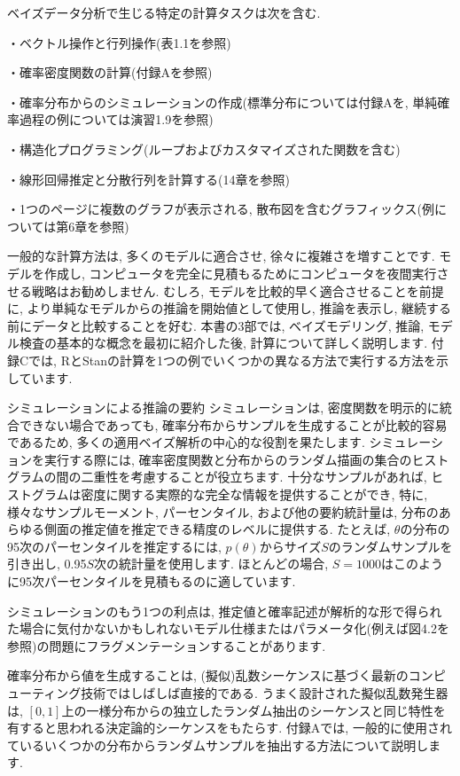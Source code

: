 \documentclass[10pt,dvipdfmx,a4]{beamer}
\begin{document}
\begin{frame}
ベイズデータ分析で生じる特定の計算タスクは次を含む.

・ベクトル操作と行列操作(表1.1を参照)

・確率密度関数の計算(付録Aを参照)

・確率分布からのシミュレーションの作成(標準分布については付録Aを, 単純確率過程の例については演習1.9を参照)

・構造化プログラミング(ループおよびカスタマイズされた関数を含む)

・線形回帰推定と分散行列を計算する(14章を参照)

・1つのページに複数のグラフが表示される, 散布図を含むグラフィックス(例については第6章を参照)

一般的な計算方法は, 多くのモデルに適合させ, 徐々に複雑さを増すことです.
モデルを作成し, コンピュータを完全に見積もるためにコンピュータを夜間実行させる戦略はお勧めしません.
むしろ, モデルを比較的早く適合させることを前提に, より単純なモデルからの推論を開始値として使用し, 推論を表示し, 継続する前にデータと比較することを好む.
本書の3部では, ベイズモデリング, 推論, モデル検査の基本的な概念を最初に紹介した後, 計算について詳しく説明します.
付録Cでは, RとStanの計算を1つの例でいくつかの異なる方法で実行する方法を示しています.
\end{frame}


\begin{frame}{シミュレーションによる推論の要約}
シミュレーションは, 密度関数を明示的に統合できない場合であっても, 確率分布からサンプルを生成することが比較的容易であるため, 多くの適用ベイズ解析の中心的な役割を果たします.
シミュレーションを実行する際には, 確率密度関数と分布からのランダム描画の集合のヒストグラムの間の二重性を考慮することが役立ちます.
十分なサンプルがあれば, ヒストグラムは密度に関する実際的な完全な情報を提供することができ, 特に, 様々なサンプルモーメント, パーセンタイル, および他の要約統計量は, 
分布のあらゆる側面の推定値を推定できる精度のレベルに提供する.
たとえば, $\theta$の分布の95次のパーセンタイルを推定するには, $p(\theta)$からサイズ$S$のランダムサンプルを引き出し, 0.95$S$次の統計量を使用します.
ほとんどの場合, $S=1000$はこのように95次パーセンタイルを見積もるのに適しています.
\end{frame}


\begin{frame}
シミュレーションのもう1つの利点は, 推定値と確率記述が解析的な形で得られた場合に気付かないかもしれないモデル仕様またはパラメータ化(例えば図4.2を参照)の問題にフラグメンテーションすることがあります.

確率分布から値を生成することは, (擬似)乱数シーケンスに基づく最新のコンピューティング技術ではしばしば直接的である.
うまく設計された擬似乱数発生器は, $[0,1]$上の一様分布からの独立したランダム抽出のシーケンスと同じ特性を有すると思われる決定論的シーケンスをもたらす.
付録Aでは, 一般的に使用されているいくつかの分布からランダムサンプルを抽出する方法について説明します.
\end{frame}
\end{document}
